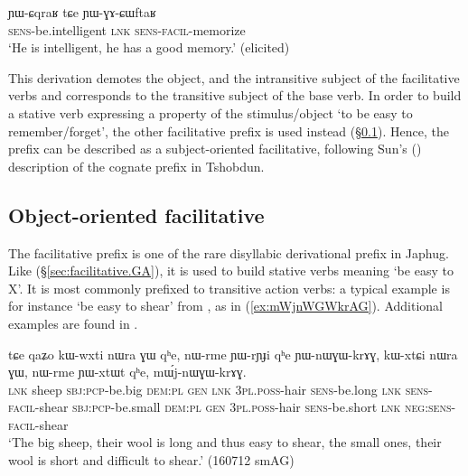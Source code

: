 \begin{exe}
\ex \label{ex:YWGACWftaR}
\gll ɲɯ-ɕqraʁ tɕe ɲɯ-ɣɤ-ɕɯftaʁ    \\
  \textsc{sens}-be.intelligent \textsc{lnk} \textsc{sens}-\textsc{facil}-memorize \\
 \glt `He is intelligent, he has a good memory.' (elicited)
\end{exe}

This derivation demotes the object, and the intransitive subject of the facilitative verbs  and  corresponds to the transitive subject of the base verb. In order to build a stative verb expressing a property of the stimulus/object `to be easy to remember/forget', the other facilitative prefix  is used instead (§\ref{sec:facilitative.nWGW}). Hence, the prefix  can be described as a subject-oriented facilitative, following Sun's (\citeyear{jackson14morpho}) description of the cognate prefix  in Tshobdun.
 
\subsection{Object-oriented facilitative} \label{sec:facilitative.nWGW}
The facilitative   prefix is one of the rare disyllabic derivational prefix in Japhug. Like  (§\ref{sec:facilitative.GA}), it is used to build stative verbs meaning `be easy to X'. It is most commonly prefixed to transitive action verbs: a typical example is for instance  `be easy to shear' from , as in (\ref{ex:mWjnWGWkrAG}). Additional examples are found in . 

\begin{exe}
\ex \label{ex:mWjnWGWkrAG}
\gll tɕe qaʑo kɯ-wxti nɯra ɣɯ qʰe, nɯ-rme ɲɯ-rɲɟi qʰe ɲɯ-nɯɣɯ-krɤɣ, kɯ-xtɕi nɯra ɣɯ, nɯ-rme ɲɯ-xtɯt qʰe, mɯ́j-nɯɣɯ-krɤɣ. \\
\textsc{lnk} sheep \textsc{sbj}:\textsc{pcp}-be.big \textsc{dem}:\textsc{pl} \textsc{gen} \textsc{lnk} \textsc{3pl}.\textsc{poss}-hair \textsc{sens}-be.long \textsc{lnk} \textsc{sens}-\textsc{facil}-shear \textsc{sbj}:\textsc{pcp}-be.small \textsc{dem}:\textsc{pl} \textsc{gen}   \textsc{3pl}.\textsc{poss}-hair \textsc{sens}-be.short \textsc{lnk} \textsc{neg}:\textsc{sens}-\textsc{facil}-shear \\
\glt `The big sheep, their wool is long and thus easy to shear, the small ones, their wool is short and difficult to shear.' (160712 smAG)
\end{exe}  

